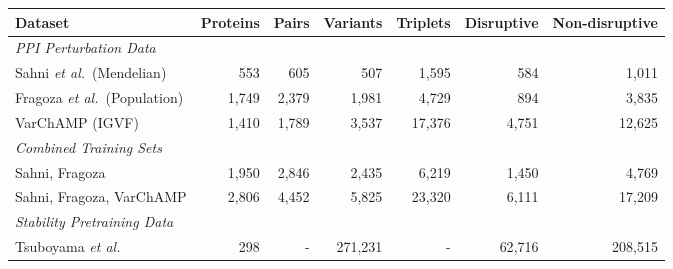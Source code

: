 \begin{tabular}{lrrrrrr}
\hline
\textbf{Dataset} & \textbf{Proteins} & \textbf{Pairs} & \textbf{Variants} & \textbf{Triplets} & \textbf{Disruptive} & \textbf{Non-disruptive} \\
\hline
\multicolumn{7}{l}{\textit{PPI Perturbation Data}} \\
Sahni \textit{et al.}~(Mendelian) & 553 & 605 & 507 & 1{,}595 & 584 & 1{,}011 \\
Fragoza \textit{et al.}~(Population) & 1{,}749 & 2{,}379 & 1{,}981 & 4{,}729 & 894 & 3{,}835 \\
VarChAMP (IGVF) & 1{,}410 & 1{,}789 & 3{,}537 & 17{,}376 & 4{,}751 & 12{,}625 \\
\hline
\multicolumn{7}{l}{\textit{Combined Training Sets}} \\
Sahni, Fragoza & 1{,}950 & 2{,}846 & 2{,}435 & 6{,}219 & 1{,}450 & 4{,}769 \\
Sahni, Fragoza, VarChAMP & 2{,}806 & 4{,}452 & 5{,}825 & 23{,}320 & 6{,}111 & 17{,}209 \\
\hline
\multicolumn{7}{l}{\textit{Stability Pretraining Data}} \\
Tsuboyama \textit{et al.} & 298 & - & 271{,}231 & - & 62{,}716 & 208{,}515 \\
\hline
\end{tabular}
